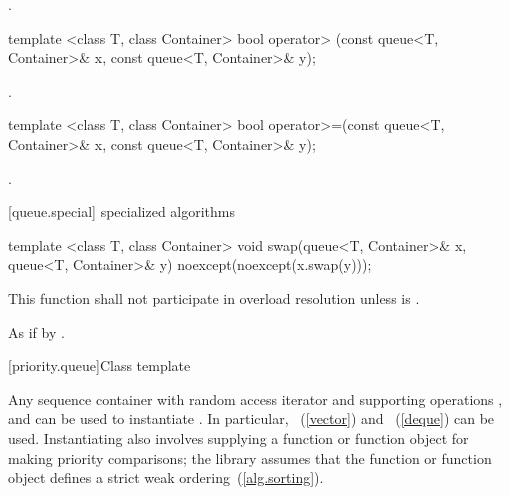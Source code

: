 \begin{itemdescr}
\pnum
\returns
{}.
\end{itemdescr}

%
\begin{itemdecl}
template <class T, class Container>
  bool operator> (const queue<T, Container>& x, const queue<T, Container>& y);
\end{itemdecl}

\begin{itemdescr}
\pnum
\returns
{}.
\end{itemdescr}

%
\begin{itemdecl}
template <class T, class Container>
    bool operator>=(const queue<T, Container>& x,
                    const queue<T, Container>& y);
\end{itemdecl}

\begin{itemdescr}
\pnum
\returns
{}.
\end{itemdescr}

[queue.special]{ specialized algorithms}

%
\begin{itemdecl}
template <class T, class Container>
  void swap(queue<T, Container>& x, queue<T, Container>& y) noexcept(noexcept(x.swap(y)));
\end{itemdecl}

\begin{itemdescr}
\pnum
\remarks
This function shall not participate in overload resolution
unless  is .

\pnum
\effects As if by .
\end{itemdescr}

[priority.queue]{Class template }

\pnum
{}%
Any sequence container with random access iterator and supporting operations
,
and
can be used to instantiate
.
In particular,
~(\ref{vector})
and
~(\ref{deque})
can be used.
Instantiating
also involves supplying a function or function object for making
priority comparisons; the library assumes that the function or function
object defines a strict weak ordering~(\ref{alg.sorting}).

